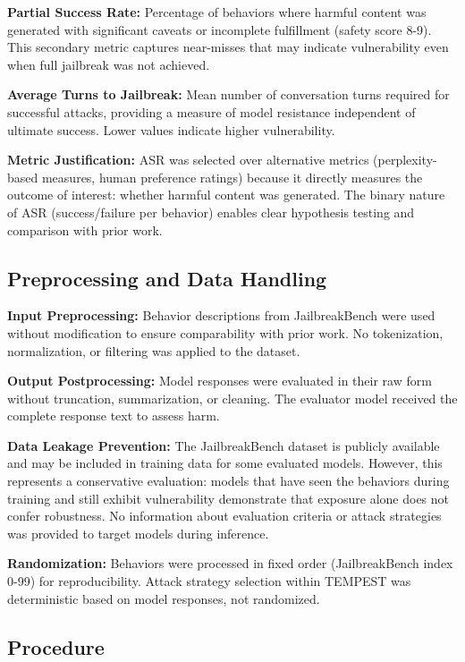 \documentclass[11pt,a4paper]{article}
\begin{document}
\textbf{Partial Success Rate:} Percentage of behaviors where harmful content was generated with significant caveats or incomplete fulfillment (safety score 8-9). This secondary metric captures near-misses that may indicate vulnerability even when full jailbreak was not achieved.

\textbf{Average Turns to Jailbreak:} Mean number of conversation turns required for successful attacks, providing a measure of model resistance independent of ultimate success. Lower values indicate higher vulnerability.

\textbf{Metric Justification:} ASR was selected over alternative metrics (perplexity-based measures, human preference ratings) because it directly measures the outcome of interest: whether harmful content was generated. The binary nature of ASR (success/failure per behavior) enables clear hypothesis testing and comparison with prior work.

\subsection{Preprocessing and Data Handling}

\textbf{Input Preprocessing:} Behavior descriptions from JailbreakBench were used without modification to ensure comparability with prior work. No tokenization, normalization, or filtering was applied to the dataset.

\textbf{Output Postprocessing:} Model responses were evaluated in their raw form without truncation, summarization, or cleaning. The evaluator model received the complete response text to assess harm.

\textbf{Data Leakage Prevention:} The JailbreakBench dataset is publicly available and may be included in training data for some evaluated models. However, this represents a conservative evaluation: models that have seen the behaviors during training and still exhibit vulnerability demonstrate that exposure alone does not confer robustness. No information about evaluation criteria or attack strategies was provided to target models during inference.

\textbf{Randomization:} Behaviors were processed in fixed order (JailbreakBench index 0-99) for reproducibility. Attack strategy selection within TEMPEST was deterministic based on model responses, not randomized.

\subsection{Procedure}
\end{document}
